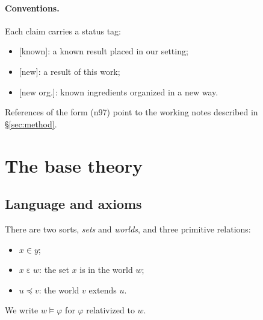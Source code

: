 \documentclass[11pt]{article}
\theoremstyle{definition}
\theoremstyle{remark}
\newcommand{\status}[1]{\textsf{[#1]}}
\newcommand{\note}[1]{\textsf{(n#1)}}
\begin{document}
\paragraph{Conventions.} Each claim carries a status tag:
\begin{itemize}
\item \status{known}: a known result placed in our setting;
\item \status{new}: a result of this work;
\item \status{new org.}: known ingredients organized in a new way.
\end{itemize}
References of the form \note{97} point to the working notes described in \S\ref{sec:method}.

\section{The base theory}\label{sec:base}

\subsection{Language and axioms}

There are two sorts, \emph{sets} and \emph{worlds}, and three primitive relations:
\begin{itemize}
\item $x\in y$;
\item $x\mathrel{\varepsilon}w$: the set $x$ is in the world $w$;
\item $u\preccurlyeq v$: the world $v$ extends $u$.
\end{itemize}
We write $w\models\varphi$ for $\varphi$ relativized to $w$.
\end{document}
